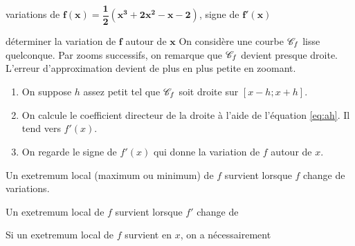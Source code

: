 \begin{exemple*}{variations de $\mathbf{f(x) = \dfrac12(x^3 + 2x^2 - x - 2)}$, signe de $\mathbf{f'(x)}$}{}
	\begin{center}
	\end{center}
\end{exemple*}

\begin{strategie*}{déterminer la variation de $\mathbf{f}$ autour de $\mathbf{x}$}{}
	On considère une courbe $\mathcal{C}_f$ lisse quelconque.
	Par zooms successifs, on remarque que $\mathcal{C}_f$ devient presque droite.
	L'erreur d'approximation devient de plus en plus petite en zoomant.
	
	\begin{enumerate}
		\item On suppose $h$ assez petit tel que $\mathcal{C}_f$ soit droite sur $[x-h ; x+h]$.
		\item On calcule le coefficient directeur de la droite à l'aide de l'équation \eqref{eq:ah}. Il tend vers $f'(x)$.
		\item On regarde le signe de $f'(x)$ qui donne la variation de $f$ autour de $x$.
	\end{enumerate}
\end{strategie*}

\begin{rappel*}{}{}
	Un exetremum local (maximum ou minimum) de $f$ survient lorsque $f$ change de variations.
\end{rappel*}

\begin{propriete}{}{}
		\begin{center}
			Un exetremum local de $f$ survient lorsque $f'$ change de \qquad\qquad\qquad\qquad
		\end{center}
		\begin{center}
			Si un exetremum local de $f$ survient en $x$, on a nécessairement \qquad\qquad\qquad\qquad
		\end{center}
\end{propriete}


